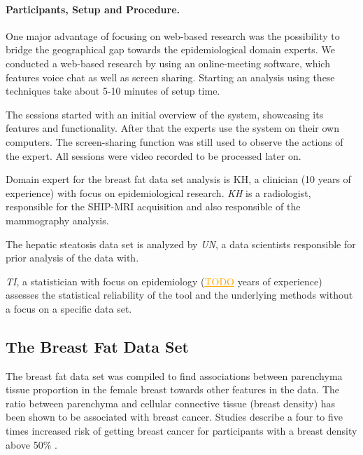 \documentclass[journal]{style/vgtc} 			          %
\newcommand{\com}[1]{\textcolor{orange}{\uline{#1}}}
\begin{document}
\paragraph{Participants, Setup and Procedure.}
One major advantage of focusing on web-based research was the possibility to bridge the geographical gap towards the epidemiological domain experts.
We conducted a web-based research by using an online-meeting software, which features voice chat as well as screen sharing.
Starting an analysis using these techniques take about 5-10 minutes of setup time.

The sessions started with an initial overview of the system, showcasing its features and functionality.
After that the experts use the system on their own computers.
The screen-sharing function was still used to observe the actions of the expert.
All sessions were video recorded to be processed later on.

Domain expert for the breast fat data set analysis is KH, a clinician (10 years of experience) with focus on epidemiological research.
\emph{KH} is a radiologist, responsible for the SHIP-MRI acquisition and also responsible of the mammography analysis.

The hepatic steatosis data set is analyzed by \emph{UN}, a data scientists responsible for prior analysis of the data with.

\emph{TI}, a statistician with focus on epidemiology (\com{TODO} years of experience) assesses the statistical reliability of the tool and the underlying methods without a focus on a specific data set.
\subsection{The Breast Fat Data Set}
The breast fat data set was compiled to find associations between parenchyma tissue proportion in the female breast towards other features in the data.
The ratio between parenchyma and cellular connective tissue (breast density) has been shown to be associated with breast cancer.
Studies describe a four to five times increased risk of getting breast cancer for participants with a breast density above 50\% \cite{Mccormack2006}.
\end{document}
